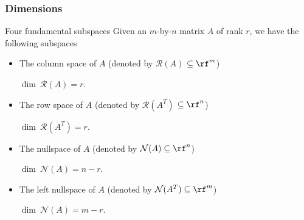 \begin{frame}
  \frametitle{Dimensions}

  \begin{block}{Four fundamental subspaces}
    Given an $m$-by-$n$ matrix $A$ of rank $r$, we have the following
    subspaces
    \begin{itemize}
    \item The column space of $A$ (denoted by ${\mathcal R}(A)$
      {$\subseteq \rf^m$})

      $\dim~{\mathcal R}(A) = r$.
    \item The row space of $A$ (denoted by ${\mathcal R}(A^T)$
      {$\subseteq \rf^n$})

      $\dim~{\mathcal R}(A^T) = r$.
    \item The nullspace of $A$ (denoted by ${\mathcal N}(A) \subseteq \rf^n$)

      $\dim~{\mathcal N}(A) = n-r$.
    \item The left nullspace of $A$ (denoted by ${\mathcal N}(A^T) \subseteq \rf^m$)

      $\dim~{\mathcal N}(A) = m-r$.
    \end{itemize}
  \end{block}
\end{frame}

